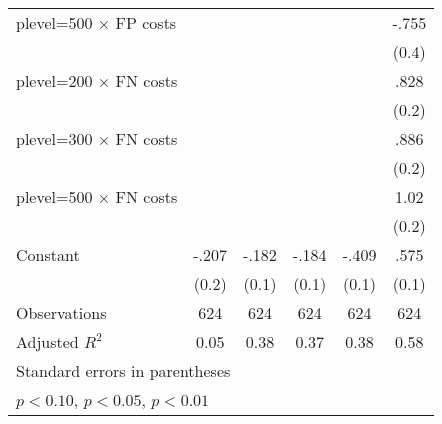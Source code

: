 \begin{table}[htbp]
\begin{tabular}{l*{5}{c}}
plevel=500 $\times$ FP costs&                  &                  &                  &                  &    -.755\sym{*}  \\
                &                  &                  &                  &                  &    (0.4)         \\
plevel=200 $\times$ FN costs&                  &                  &                  &                  &     .828\sym{***}\\
                &                  &                  &                  &                  &    (0.2)         \\
plevel=300 $\times$ FN costs&                  &                  &                  &                  &     .886\sym{***}\\
                &                  &                  &                  &                  &    (0.2)         \\
plevel=500 $\times$ FN costs&                  &                  &                  &                  &     1.02\sym{***}\\
                &                  &                  &                  &                  &    (0.2)         \\
Constant        &    -.207         &    -.182\sym{**} &    -.184\sym{**} &    -.409\sym{***}&     .575\sym{***}\\
                &    (0.2)         &    (0.1)         &    (0.1)         &    (0.1)         &    (0.1)         \\
\hline
Observations    &      624         &      624         &      624         &      624         &      624         \\
Adjusted \(R^{2}\)&     0.05         &     0.38         &     0.37         &     0.38         &     0.58         \\
\hline\hline
\multicolumn{6}{l}{\footnotesize Standard errors in parentheses}\\
\multicolumn{6}{l}{\footnotesize \sym{*} \(p<0.10\), \sym{**} \(p<0.05\), \sym{***} \(p<0.01\)}\\
\end{tabular}
\end{table}
